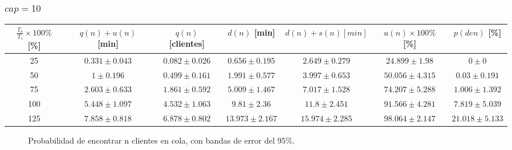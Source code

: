 \subsubsection[cap = 10]{$cap = 10$}

\begin{small}
  \begin{tabular}{||c||c|c|c|c|c|c||}
    \hline \hline
    $\frac{T_a}{T_s}\times100\%$ [\%] & $q(n)+u(n)$ [min] & $q(n)$ [clientes] & $d(n)$ [min] & $d(n)+s(n) [min]$ & $u(n)\times100\%$ [\%] & $p(den)$ [\%] \\
    \hline \hline
    25 & $0.331 \pm 0.043$ & $0.082 \pm 0.026$ & $0.656 \pm 0.195$ & $2.649 \pm 0.279$ & $24.899 \pm 1.98$ & $0 \pm 0$ \\
    \hline
    50 & $1 \pm 0.196$ & $0.499 \pm 0.161$ & $1.991 \pm 0.577$ & $3.997 \pm 0.653$ & $50.056 \pm 4.315$ & $0.03 \pm 0.191$ \\
    \hline
    75 & $2.603 \pm 0.633$ & $1.861 \pm 0.592$ & $5.009 \pm 1.467$ & $7.017 \pm 1.528$ & $74.207 \pm 5.288$ & $1.006 \pm 1.392$ \\
    \hline
    100 & $5.448\pm 1.097$ & $4.532 \pm 1.063$ & $9.81 \pm 2.36$ & $11.8 \pm 2.451$ & $91.566 \pm 4.281$ & $7.819 \pm 5.039$ \\
    \hline
    125 & $7.858 \pm 0.818$ & $6.878 \pm 0.802$ & $13.973 \pm 2.167$ & $15.974 \pm 2.285$ & $98.064 \pm 2.147$ & $21.018 \pm 5.133$ \\
    \hline \hline
  \end{tabular}
\end{small}

\begin{figure}[H]
  \centering
  \begin{subfigure}{0.267\linewidth}
  \end{subfigure}\hspace{0.35cm}
  \begin{subfigure}{0.267\linewidth}
  \end{subfigure}\hspace{0.35cm}
  \begin{subfigure}{0.267\linewidth}
  \end{subfigure}
  \begin{subfigure}{0.267\linewidth}
  \end{subfigure}\hspace{0.35cm}
  \begin{subfigure}{0.267\linewidth}
  \end{subfigure}
  \caption{Probabilidad de encontrar n clientes en cola, con bandas de error del 95\%.}
\end{figure}

